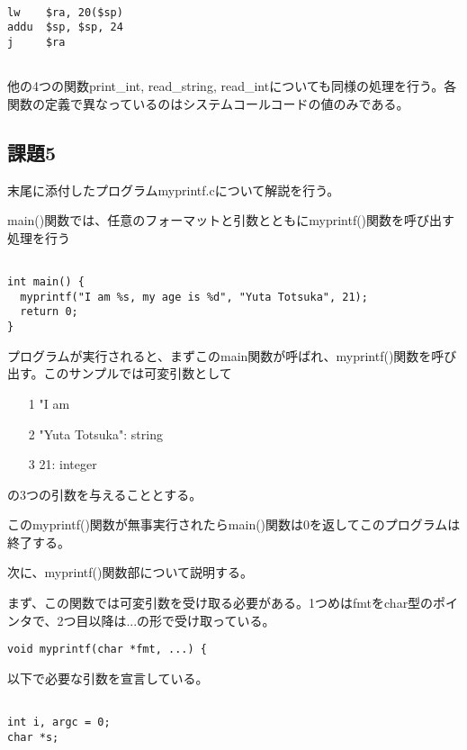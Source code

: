 \documentclass[a4j]{jarticle}
\begin{document}
{\baselineskip 3mm
  \begin{verbatim}

lw    $ra, 20($sp)
addu  $sp, $sp, 24
j     $ra


  \end{verbatim}
}

他の4つの関数print\_int, read\_string, read\_intについても同様の処理を行う。各関数の定義で異なっているのはシステムコールコードの値のみである。



\subsection{課題5}

末尾に添付したプログラムmyprintf.cについて解説を行う。

main()関数では、任意のフォーマットと引数とともにmyprintf()関数を呼び出す処理を行う

{\baselineskip 3mm
  \begin{verbatim}

int main() {
  myprintf("I am %s, my age is %d", "Yuta Totsuka", 21);
  return 0;
}

\end{verbatim}
}

プログラムが実行されると、まずこのmain関数が呼ばれ、myprintf()関数を呼び出す。このサンプルでは可変引数として

\begin{itemize}
\item[1]"I am %
\item[2]"Yuta Totsuka": string
\item[3]21: integer
\end{itemize}

の3つの引数を与えることとする。

このmyprintf()関数が無事実行されたらmain()関数は0を返してこのプログラムは終了する。


次に、myprintf()関数部について説明する。

まず、この関数では可変引数を受け取る必要がある。1つめはfmtをchar型のポインタで、2つ目以降は...の形で受け取っている。

\begin{verbatim}
void myprintf(char *fmt, ...) {
\end{verbatim}

以下で必要な引数を宣言している。

{\baselineskip 3mm
  \begin{verbatim}

int i, argc = 0;
char *s;

\end{verbatim}
}
\end{document}
